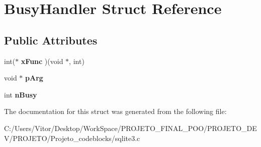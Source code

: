 \hypertarget{struct_busy_handler}{\section{Busy\-Handler Struct Reference}
\label{struct_busy_handler}
}
\subsection*{Public Attributes}
\begin{DoxyCompactItemize}
\item 
\hypertarget{struct_busy_handler_aafc84c4e4934de2d5bdf02f268e9340f}{int($\ast$ {\bfseries x\-Func} )(void $\ast$, int)}\label{struct_busy_handler_aafc84c4e4934de2d5bdf02f268e9340f}

\item 
\hypertarget{struct_busy_handler_a1c793d2b815e79cf3684de46847551bd}{void $\ast$ {\bfseries p\-Arg}}\label{struct_busy_handler_a1c793d2b815e79cf3684de46847551bd}

\item 
\hypertarget{struct_busy_handler_aac4531c677ed5ae9e4757ca1b02c568b}{int {\bfseries n\-Busy}}\label{struct_busy_handler_aac4531c677ed5ae9e4757ca1b02c568b}

\end{DoxyCompactItemize}


The documentation for this struct was generated from the following file\-:\begin{DoxyCompactItemize}
\item 
C\-:/\-Users/\-Vitor/\-Desktop/\-Work\-Space/\-P\-R\-O\-J\-E\-T\-O\-\_\-\-F\-I\-N\-A\-L\-\_\-\-P\-O\-O/\-P\-R\-O\-J\-E\-T\-O\-\_\-\-D\-E\-V/\-P\-R\-O\-J\-E\-T\-O/\-Projeto\-\_\-codeblocks/sqlite3.\-c\end{DoxyCompactItemize}
